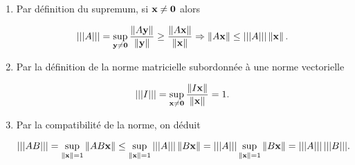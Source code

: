 \begin{enumerate}
  \item Par définition du supremum, si $\BoldX \neq \BoldZero$ alors
  
  \begin{equation*}
    \triple{A} = \sup_{\BoldY \neq \BoldZero} \dfrac{\norm{A \BoldY}}{\norm{\BoldY}}
    \geq \dfrac{\norm{A \BoldX}}{\norm{\BoldX}}
    \Rightarrow 
    \norm{A \BoldX} \leq \triple{A} \norm{\BoldX}.
  \end{equation*}
  
  \item Par la définition de la norme matricielle subordonnée à une norme vectorielle
  
  \begin{equation*}
    \triple{I} = \sup_{\BoldX \neq \BoldZero} \dfrac{\norm{I \BoldX}}{\norm{\BoldX}} = 1.
  \end{equation*}
  
  \item Par la compatibilité de la norme, on déduit
  
  \begin{equation*}
    \triple{A B}
    = \sup_{\norm{\BoldX} = 1} \norm{A B \BoldX}
    \leq \sup_{\norm{\BoldX} = 1} \triple{A} \norm{B \BoldX}
    = \triple{A} \sup_{\norm{\BoldX} = 1} \norm{B \BoldX}
    = \triple{A} \triple{B}.
  \end{equation*}
  
\end{enumerate}